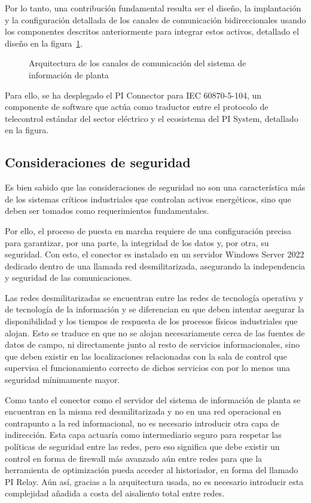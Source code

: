 Por lo tanto, una contribución fundamental resulta ser el diseño, la implantación y la configuración detallada de los canales de comunicación bidireccionales usando los componentes descritos anteriormente para integrar estos activos, detallado el diseño en la figura~\ref{fig:sistema-de-información-de-planta}.

\begin{figure}
\centering
\caption{Arquitectura de los canales de comunicación del sistema de información de planta}
\label{fig:sistema-de-información-de-planta}
\end{figure}

Para ello, se ha desplegado el PI Connector para IEC 60870-5-104, un componente de software que actúa como traductor entre el protocolo de telecontrol estándar del sector eléctrico y el ecosistema del PI System, detallado en la figura.

\subsection{Consideraciones de seguridad}
\label{makereference3.4.2}

Es bien sabido que las consideraciones de seguridad no son una característica más de los sistemas críticos industriales que controlan activos energéticos, sino que deben ser tomados como requerimientos fundamentales.

Por ello, el proceso de puesta en marcha requiere de una configuración precisa para garantizar, por una parte, la integridad de los datos y, por otra, su seguridad. Con esto, el conector es instalado en un servidor Windows Server 2022 dedicado dentro de una llamada red desmilitarizada, asegurando la independencia y seguridad de las comunicaciones.

Las redes desmilitarizadas se encuentran entre las redes de tecnología operativa y de tecnología de la información y se diferencian en que deben intentar asegurar la disponibilidad y los tiempos de respuesta de los procesos físicos industriales que alojan. Esto se traduce en que no se alojan necesariamente cerca de las fuentes de datos de campo, ni directamente junto al resto de servicios informacionales, sino que deben existir en las localizaciones relacionadas con la sala de control que supervisa el funcionamiento correcto de dichos servicios con por lo menos una seguridad mínimamente mayor.

Como tanto el conector como el servidor del sistema de información de planta se encuentran en la misma red desmilitarizada y no en una red operacional en contrapunto a la red informacional, no es necesario introducir otra capa de indirección. Esta capa actuaría como intermediario seguro para respetar las políticas de seguridad entre las redes, pero eso significa que debe existir un control en forma de firewall más avanzado aún entre redes para que la herramienta de optimización pueda acceder al historiador, en forma del llamado PI Relay. Aún así, gracias a la arquitectura usada, no es necesario introducir esta complejidad añadida a costa del aisaliento total entre redes.

